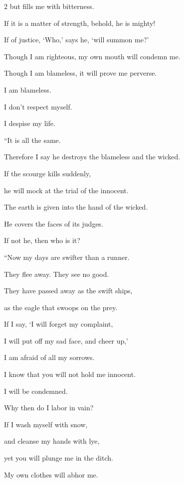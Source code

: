 \begin{multicols}{2}
	but fills me with bitterness.
	
	\myverse{}If it is a matter of strength, behold, he is mighty!
	
	If of justice, ‘Who,’ says he, ‘will summon me?’
	
	\myverse{}Though I am righteous, my own mouth will condemn me.
	
	Though I am blameless, it will prove me perverse.
	
	\myverse{}I am blameless.
	
	I don’t respect myself.
	
	I despise my life.
	
	\vspace{\baselineskip}
	
	\myverse{}“It is all the same.
	
	Therefore I say he destroys the blameless and the wicked.
	
	\myverse{}If the scourge kills suddenly,
	
	he will mock at the trial of the innocent.
	
	\myverse{}The earth is given into the hand of the wicked.
	
	He covers the faces of its judges.
	
	If not he, then who is it?
	
	\vspace{\baselineskip}
	
	\myverse{}“Now my days are swifter than a runner.
	
	They flee away. They see no good.
	
	\myverse{}They have passed away as the swift ships,
	
	as the eagle that swoops on the prey.
	
	\myverse{}If I say, ‘I will forget my complaint,
	
	I will put off my sad face, and cheer up,’
	
	\myverse{}I am afraid of all my sorrows.
	
	I know that you will not hold me innocent.
	
	\myverse{}I will be condemned.
	
	Why then do I labor in vain?
	
	\myverse{}If I wash myself with snow,
	
	and cleanse my hands with lye,
	
	\myverse{}yet you will plunge me in the ditch.
	
	My own clothes will abhor me.
	

\end{multicols}
